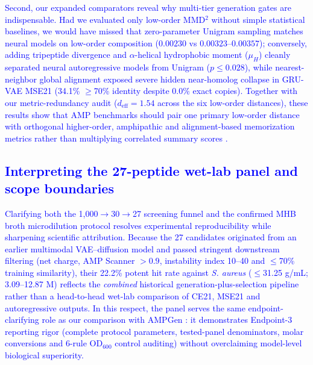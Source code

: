 \documentclass[unnumsec,webpdf,contemporary,large]{oup-authoring-template}
\newcommand{\rev}[1]{\textcolor{blue}{#1}}
\begin{document}
\rev{Second, our expanded comparators reveal why multi-tier generation gates are indispensable. Had we evaluated only low-order MMD$^2$ without simple statistical baselines, we would have missed that zero-parameter Unigram sampling matches neural models on low-order composition ($0.00230$ vs $0.00323\text{--}0.00357$); conversely, adding tripeptide divergence and $\alpha$-helical hydrophobic moment ($\mu_H$) cleanly separated neural autoregressive models from Unigram ($p\leq 0.028$), while nearest-neighbor global alignment exposed severe hidden near-homolog collapse in GRU-VAE MSE21 (34.1\% $\geq$70\% identity despite 0.0\% exact copies). Together with our metric-redundancy audit ($d_{\mathrm{eff}}=1.54$ across the six low-order distances), these results show that AMP benchmarks should pair one primary low-order distance with orthogonal higher-order, amphipathic and alignment-based memorization metrics rather than multiplying correlated summary scores \cite{ref4,ref5,ref43,ref45}.}

\rev{\subsection{Interpreting the 27-peptide wet-lab panel and scope boundaries}}

\rev{Clarifying both the 1,000$\rightarrow$30$\rightarrow$27 screening funnel and the confirmed MHB broth microdilution protocol resolves experimental reproducibility while sharpening scientific attribution. Because the 27 candidates originated from an earlier multimodal VAE--diffusion model and passed stringent downstream filtering (net charge, AMP Scanner $>0.9$, instability index 10--40 and $\leq$70\% training similarity), their 22.2\% potent hit rate against \textit{S. aureus} ($\leq$31.25 \textmu{}g/mL; 3.09--12.87 \textmu{}M) reflects the \emph{combined} historical generation-plus-selection pipeline rather than a head-to-head wet-lab comparison of CE21, MSE21 and autoregressive outputs. In this respect, the panel serves the same endpoint-clarifying role as our comparison with AMPGen \cite{ref9}: it demonstrates Endpoint-3 reporting rigor (complete protocol parameters, tested-panel denominators, molar conversions and 6-rule OD$_{600}$ control auditing) without overclaiming model-level biological superiority.}
\end{document}

